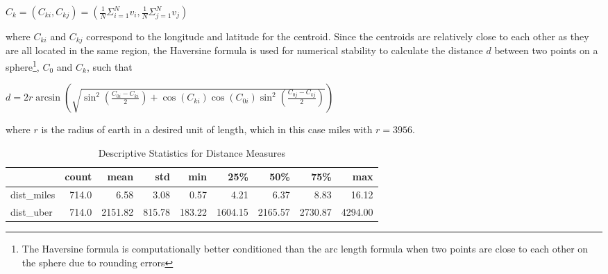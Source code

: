\documentclass{article}
\begin{document}
\begin{center}
    $C_k = (C_{ki}, C_{kj})  = (\frac{1}{N} \Sigma_{i=1}^{N} v_i, \frac{1}{N} \Sigma_{j=1}^{N} v_j) $
\end{center}

where $C_{ki}$ and $C_{kj}$ correspond to the longitude and latitude for the centroid. Since the centroids are relatively close to each other as they are all located in the same region, the Haversine formula \citep{VanBrummelenGlen2017Hm:t} is used for numerical stability to calculate the distance $d$ between two points on a sphere\footnote{The Haversine formula is computationally better conditioned than the arc length formula when two points are close to each other on the sphere due to rounding errors}, $C_0$ and $C_k$, such that

\begin{center}
    $d =2 r \arcsin \left(\sqrt{\sin ^{2}\left(\frac{C_{0i}-C_{ki}}{2}\right)+\cos \left(C_{ki}\right) \cos \left(C_{0i}\right) \sin ^{2}\left(\frac{C_{0j}-C_{kj}}{2}\right)}\right)$
\end{center}

where $r$ is the radius of earth in a desired unit of length, which in this case miles with $r = 3956$. 

\begin{table}[t]
\centering
\caption{Descriptive Statistics for Distance Measures} 
  \label{table:distance} 
\begin{tabular}{lrrrrrrrr}
\toprule
{} &  count &     mean &     std &     min &      25\% &      50\% &      75\% &      max \\
\midrule
dist\_miles     &  714.0 &     6.58 &    3.08 &    0.57 &     4.21 &     6.37 &     8.83 &    16.12 \\
dist\_uber &  714.0 &  2151.82 &  815.78 &  183.22 &  1604.15 &  2165.57 &  2730.87 &  4294.00 \\
\bottomrule
\end{tabular}
\end{table}
\end{document}
